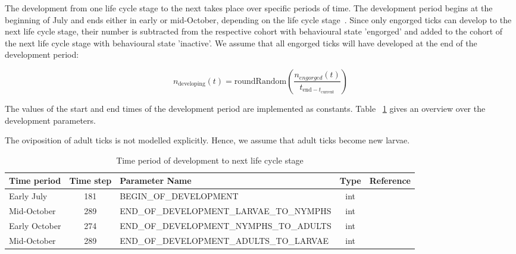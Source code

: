 \documentclass[a4paper, 11pt]{scrartcl}
\begin{document}
The development from one life cycle stage to the next takes place over specific periods of time. The development period begins at the beginning of July and ends either in early or mid-October, depending on the life cycle stage~\parencite{tba}. Since only engorged ticks can develop to the next life cycle stage, their number is subtracted from the respective cohort with behavioural state 'engorged' and added to the cohort of the next life cycle stage with behavioural state 'inactive'. We assume that all engorged ticks will have developed at the end of the development period:

\begin{equation}
n_{\text{developing}}(t) = \text{roundRandom}(\frac{n_{engorged}(t)}{t_{\text{end} - t_{\text{current}}}})
\end{equation}

The values of the start and end times of the development period are implemented as constants. Table ~\ref{tab:development_parameters} gives an overview over the development parameters.

The oviposition of adult ticks is not modelled explicitly. Hence, we assume that adult ticks become new larvae.

\begin{table}[h!]
\caption{Time period of development to next life cycle stage}
\label{tab:development_parameters}
\begin{tabularx}{\textwidth}{lclcl}
\toprule
\textbf{Time period} 	& \textbf{Time step} & \textbf{Parameter Name}							& \textbf{Type}    & \textbf{Reference} \\
\midrule
Early July   			& 181   			 & \tiny{BEGIN\_OF\_DEVELOPMENT}					& int      & ~\cite{tba}   		\\
Mid-October     		& 289      			 & \tiny{END\_OF\_DEVELOPMENT\_LARVAE\_TO\_NYMPHS}	& int      & ~\cite{tba}      	\\
Early October    		& 274    			 & \tiny{END\_OF\_DEVELOPMENT\_NYMPHS\_TO\_ADULTS}	& int      & ~\cite{tba}     	\\
Mid-October     		& 289      			 & \tiny{END\_OF\_DEVELOPMENT\_ADULTS\_TO\_LARVAE}	& int      & ~\cite{tba}        \\
\bottomrule
\end{tabularx}
\end{table}
\end{document}
